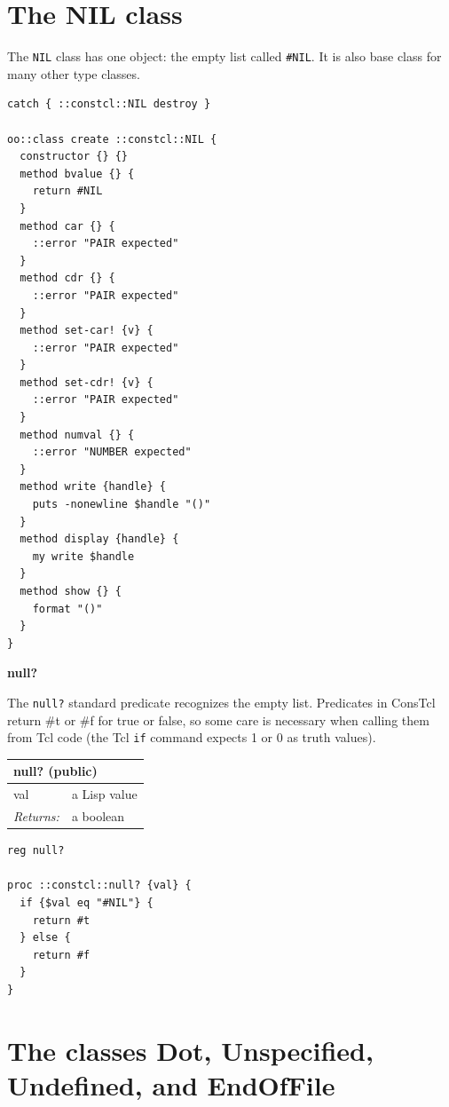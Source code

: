 \documentclass[twoside,9pt]{report}
\begin{document}
\section{The NIL class}
\label{the-nil-class}

The \texttt{NIL} class has one object: the empty list called \texttt{\#NIL}. It is also base class for many other type classes.

\noindent\makebox[\linewidth]{\rule{\linewidth}{0.4pt}}
\begin{lstlisting}
catch { ::constcl::NIL destroy }
 
oo::class create ::constcl::NIL {
  constructor {} {}
  method bvalue {} {
    return #NIL
  }
  method car {} {
    ::error "PAIR expected"
  }
  method cdr {} {
    ::error "PAIR expected"
  }
  method set-car! {v} {
    ::error "PAIR expected"
  }
  method set-cdr! {v} {
    ::error "PAIR expected"
  }
  method numval {} {
    ::error "NUMBER expected"
  }
  method write {handle} {
    puts -nonewline $handle "()"
  }
  method display {handle} {
    my write $handle
  }
  method show {} {
    format "()"
  }
}
\end{lstlisting}
\noindent\makebox[\linewidth]{\rule{\linewidth}{0.4pt}}

\textbf{null?}


The \texttt{null?} standard predicate recognizes the empty list. Predicates in ConsTcl return \#t or \#f for true or false, so some care is necessary when calling them from Tcl code (the Tcl \texttt{if} command expects 1 or 0 as truth values).

\begin{tabular}{ |l l| }
\hline
\multicolumn{2}{|l|}{null? (public)} \\
\hline
val & a Lisp value \\
\textit{Returns:} & a boolean \\
\hline
\end{tabular}

\noindent\makebox[\linewidth]{\rule{\linewidth}{0.4pt}}
\begin{lstlisting}
reg null?
 
proc ::constcl::null? {val} {
  if {$val eq "#NIL"} {
    return #t
  } else {
    return #f
  }
}
\end{lstlisting}
\noindent\makebox[\linewidth]{\rule{\linewidth}{0.4pt}}
\section{The classes Dot, Unspecified, Undefined, and EndOfFile}
\label{the-classes-dot,-unspecified,-undefined,-and-endoffile}
\end{document}
